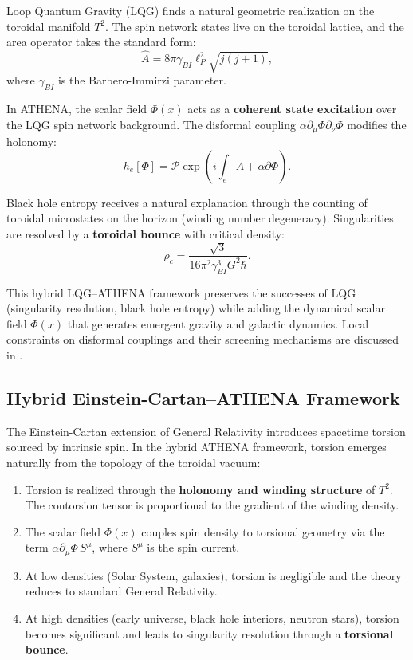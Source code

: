 \documentclass[12pt, a4paper]{article}
\begin{document}
Loop Quantum Gravity (LQG) finds a natural geometric realization on the toroidal manifold $T^2$. The spin network states live on the toroidal lattice, and the area operator takes the standard form:
\begin{equation}
\hat{A} = 8\pi \gamma_{BI} \ell_P^2 \sqrt{j(j+1)},
\end{equation}
where $\gamma_{BI}$ is the Barbero-Immirzi parameter.

In ATHENA, the scalar field $\Phi(x)$ acts as a \textbf{coherent state excitation} over the LQG spin network background. The disformal coupling $\alpha \partial_\mu \Phi \partial_\nu \Phi$ modifies the holonomy:
\begin{equation}
h_e[\Phi] = \mathcal{P} \exp\left( i \int_e A + \alpha \partial\Phi \right).
\end{equation}

Black hole entropy receives a natural explanation through the counting of toroidal microstates on the horizon (winding number degeneracy). Singularities are resolved by a \textbf{toroidal bounce} with critical density:
\begin{equation}
\rho_c = \frac{\sqrt{3}}{16\pi^2 \gamma_{BI}^3 G^2 \hbar}.
\end{equation}

This hybrid LQG–ATHENA framework preserves the successes of LQG (singularity resolution, black hole entropy) while adding the dynamical scalar field $\Phi(x)$ that generates emergent gravity and galactic dynamics. Local constraints on disformal couplings and their screening mechanisms are discussed in \cite{zumalacarregui2012_screening}.

\subsection{Hybrid Einstein-Cartan–ATHENA Framework}
\label{sec:ec}

The Einstein-Cartan extension of General Relativity introduces spacetime torsion sourced by intrinsic spin. In the hybrid ATHENA framework, torsion emerges naturally from the topology of the toroidal vacuum:

\begin{enumerate}
    \item Torsion is realized through the \textbf{holonomy and winding structure} of $T^2$. The contorsion tensor is proportional to the gradient of the winding density.
    \item The scalar field $\Phi(x)$ couples spin density to torsional geometry via the term $\alpha \partial_\mu \Phi \, S^\mu$, where $S^\mu$ is the spin current.
    \item At low densities (Solar System, galaxies), torsion is negligible and the theory reduces to standard General Relativity.
    \item At high densities (early universe, black hole interiors, neutron stars), torsion becomes significant and leads to singularity resolution through a \textbf{torsional bounce}.
\end{enumerate}
\end{document}
